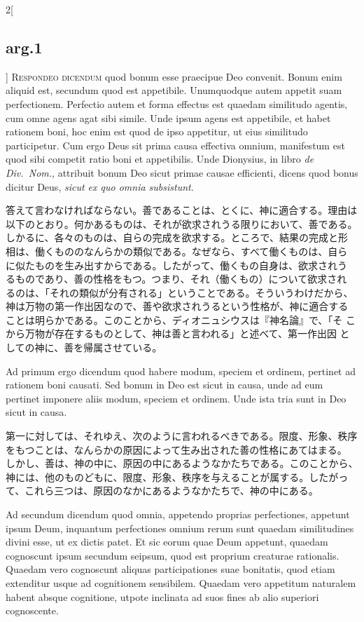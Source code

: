 \documentclass[paper=a4paper,fontsize=10pt,jafontsize=9pt,titlepage]{jlreq}
\begin{document}
\begin{paracol}{2}[\subsection{arg.1}]
{\scshape Respondeo dicendum} quod bonum esse praecipue Deo
 convenit. Bonum enim aliquid est, secundum quod est
 appetibile. Unumquodque autem appetit suam perfectionem. Perfectio
 autem et forma effectus est quaedam similitudo agentis, cum omne agens
 agat sibi simile. Unde ipsum agens est appetibile, et habet rationem
 boni, hoc enim est quod de ipso appetitur, ut eius similitudo
 participetur. Cum ergo Deus sit prima causa effectiva omnium,
 manifestum est quod sibi competit ratio boni et appetibilis. Unde
 Dionysius, in libro {\itshape de Div.~Nom.}, attribuit bonum Deo sicut primae
 causae efficienti, dicens quod bonus dicitur Deus, {\itshape sicut ex quo omnia
 subsistunt}.

\switchcolumn

答えて言わなければならない。善であることは、とくに、神に適合する。理由は
 以下のとおり。何かあるものは、それが欲求されうる限りにおいて、善である。
 しかるに、各々のものは、自らの完成を欲求する。ところで、結果の完成と形
 相は、働くもののなんらかの類似である。なぜなら、すべて働くものは、自ら
 に似たものを生み出すからである。したがって、働くもの自身は、欲求されう
 るものであり、善の性格をもつ。つまり、それ（働くもの）について欲求され
 るのは、「それの類似が分有される」ということである。そういうわけだから、
 神は万物の第一作出因なので、善や欲求されうるという性格が、神に適合する
 ことは明らかである。このことから、ディオニュシウスは『神名論』で、「そ
 こから万物が存在するものとして、神は善と言われる」と述べて、第一作出因
 としての神に、善を帰属させている。

\switchcolumn*

Ad primum ergo dicendum quod habere modum, speciem et ordinem, pertinet
 ad rationem boni causati. Sed bonum in Deo est sicut in causa, unde ad
 eum pertinet imponere aliis modum, speciem et ordinem. Unde ista tria
 sunt in Deo sicut in causa.

\switchcolumn

第一に対しては、それゆえ、次のように言われるべきである。限度、形象、秩序
 をもつことは、なんらかの原因によって生み出された善の性格にあてはまる。
 しかし、善は、神の中に、原因の中にあるようなかたちである。このことから、
 神には、他のものどもに、限度、形象、秩序を与えることが属する。したがっ
 て、これら三つは、原因のなかにあるようなかたちで、神の中にある。

\switchcolumn*

Ad secundum dicendum quod omnia, appetendo proprias perfectiones,
 appetunt ipsum Deum, inquantum perfectiones omnium rerum sunt quaedam
 similitudines divini esse, ut ex dictis patet. Et sic eorum quae Deum
 appetunt, quaedam cognoscunt ipsum secundum seipsum, quod est proprium
 creaturae rationalis. Quaedam vero cognoscunt aliquas participationes
 suae bonitatis, quod etiam extenditur usque ad cognitionem
 sensibilem. Quaedam vero appetitum naturalem habent absque cognitione,
 utpote inclinata ad suos fines ab alio superiori cognoscente.


\end{paracol}
\end{document}
